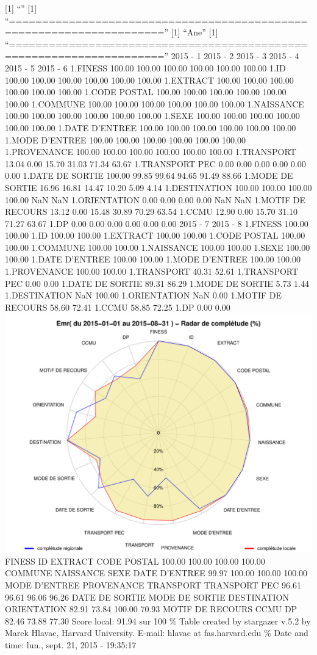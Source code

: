 \documentclass[]{article}
\begin{document}
{[}1{]} ``'' {[}1{]}
``=====================================================================''
{[}1{]} ``Ane'' {[}1{]}
``=====================================================================''
2015 - 1 2015 - 2 2015 - 3 2015 - 4 2015 - 5 2015 - 6 1.FINESS 100.00
100.00 100.00 100.00 100.00 100.00 1.ID 100.00 100.00 100.00 100.00
100.00 100.00 1.EXTRACT 100.00 100.00 100.00 100.00 100.00 100.00 1.CODE
POSTAL 100.00 100.00 100.00 100.00 100.00 100.00 1.COMMUNE 100.00 100.00
100.00 100.00 100.00 100.00 1.NAISSANCE 100.00 100.00 100.00 100.00
100.00 100.00 1.SEXE 100.00 100.00 100.00 100.00 100.00 100.00 1.DATE
D'ENTREE 100.00 100.00 100.00 100.00 100.00 100.00 1.MODE D'ENTREE
100.00 100.00 100.00 100.00 100.00 100.00 1.PROVENANCE 100.00 100.00
100.00 100.00 100.00 100.00 1.TRANSPORT 13.04 0.00 15.70 31.03 71.34
63.67 1.TRANSPORT PEC 0.00 0.00 0.00 0.00 0.00 0.00 1.DATE DE SORTIE
100.00 99.85 99.64 94.65 91.49 88.66 1.MODE DE SORTIE 16.96 16.81 14.47
10.20 5.09 4.14 1.DESTINATION 100.00 100.00 100.00 100.00 NaN NaN
1.ORIENTATION 0.00 0.00 0.00 0.00 NaN NaN 1.MOTIF DE RECOURS 13.12 0.00
15.48 30.89 70.29 63.54 1.CCMU 12.90 0.00 15.70 31.10 71.27 63.67 1.DP
0.00 0.00 0.00 0.00 0.00 0.00 2015 - 7 2015 - 8 1.FINESS 100.00 100.00
1.ID 100.00 100.00 1.EXTRACT 100.00 100.00 1.CODE POSTAL 100.00 100.00
1.COMMUNE 100.00 100.00 1.NAISSANCE 100.00 100.00 1.SEXE 100.00 100.00
1.DATE D'ENTREE 100.00 100.00 1.MODE D'ENTREE 100.00 100.00 1.PROVENANCE
100.00 100.00 1.TRANSPORT 40.31 52.61 1.TRANSPORT PEC 0.00 0.00 1.DATE
DE SORTIE 89.31 86.29 1.MODE DE SORTIE 5.73 1.44 1.DESTINATION NaN
100.00 1.ORIENTATION NaN 0.00 1.MOTIF DE RECOURS 58.60 72.41 1.CCMU
58.85 72.25 1.DP 0.00 0.00
\includegraphics{completude_files/figure-latex/finess-18.pdf} FINESS ID
EXTRACT CODE POSTAL 100.00 100.00 100.00 100.00 COMMUNE NAISSANCE SEXE
DATE D'ENTREE 99.97 100.00 100.00 100.00 MODE D'ENTREE PROVENANCE
TRANSPORT TRANSPORT PEC 96.61 96.61 96.06 96.26 DATE DE SORTIE MODE DE
SORTIE DESTINATION ORIENTATION 82.91 73.84 100.00 70.93 MOTIF DE RECOURS
CCMU DP 82.46 73.88 77.30 Score local: 91.94 sur 100 \% Table created by
stargazer v.5.2 by Marek Hlavac, Harvard University. E-mail: hlavac at
fas.harvard.edu \% Date and time: lun., sept. 21, 2015 - 19:35:17
\end{document}
